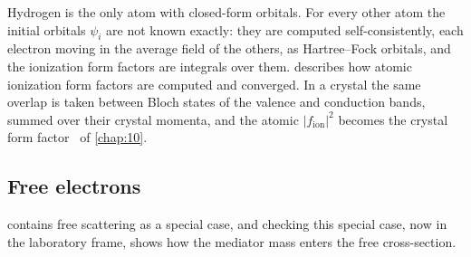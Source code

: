 Hydrogen is the only atom with closed-form orbitals. For every other atom the initial orbitals $\psi_i$ are not known exactly: they are computed self-consistently, each electron moving in the average field of the others, as Hartree--Fock orbitals, and the ionization form factors are integrals over them.  describes how atomic ionization form factors are computed and converged. In a crystal the same overlap is taken between Bloch states of the valence and conduction bands, summed over their crystal momenta, and the atomic $|f_{\mathrm{ion}}|^2$ becomes the crystal form factor~\cite[Eqs.~(3.13) and (3.17)]{essig2016direct} of \cref{chap:10}.

\subsection{Free electrons}

 contains free scattering as a special case, and checking this special case, now in the laboratory frame, shows how the mediator mass enters the free cross-section.


